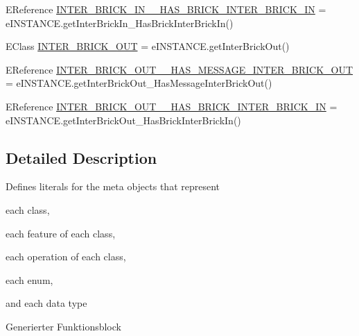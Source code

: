 \begin{DoxyCompactItemize}
\item 
E\-Reference \hyperlink{interfaceshootingmachineemfmodel_1_1_shootingmachineemfmodel_package_1_1_literals_a7ab2471dc236915d8eb7f817ffb4cfde}{I\-N\-T\-E\-R\-\_\-\-B\-R\-I\-C\-K\-\_\-\-I\-N\-\_\-\-\_\-\-H\-A\-S\-\_\-\-B\-R\-I\-C\-K\-\_\-\-I\-N\-T\-E\-R\-\_\-\-B\-R\-I\-C\-K\-\_\-\-I\-N} = e\-I\-N\-S\-T\-A\-N\-C\-E.\-get\-Inter\-Brick\-In\-\_\-\-Has\-Brick\-Inter\-Brick\-In()
\item 
E\-Class \hyperlink{interfaceshootingmachineemfmodel_1_1_shootingmachineemfmodel_package_1_1_literals_a6e54dbc9616d23f7886fc22da418e631}{I\-N\-T\-E\-R\-\_\-\-B\-R\-I\-C\-K\-\_\-\-O\-U\-T} = e\-I\-N\-S\-T\-A\-N\-C\-E.\-get\-Inter\-Brick\-Out()
\item 
E\-Reference \hyperlink{interfaceshootingmachineemfmodel_1_1_shootingmachineemfmodel_package_1_1_literals_a32d3cbcc4610d49a679037f792bd950c}{I\-N\-T\-E\-R\-\_\-\-B\-R\-I\-C\-K\-\_\-\-O\-U\-T\-\_\-\-\_\-\-H\-A\-S\-\_\-\-M\-E\-S\-S\-A\-G\-E\-\_\-\-I\-N\-T\-E\-R\-\_\-\-B\-R\-I\-C\-K\-\_\-\-O\-U\-T} = e\-I\-N\-S\-T\-A\-N\-C\-E.\-get\-Inter\-Brick\-Out\-\_\-\-Has\-Message\-Inter\-Brick\-Out()
\item 
E\-Reference \hyperlink{interfaceshootingmachineemfmodel_1_1_shootingmachineemfmodel_package_1_1_literals_a1d7df3786e32cbcd1e6b6c767feda7f1}{I\-N\-T\-E\-R\-\_\-\-B\-R\-I\-C\-K\-\_\-\-O\-U\-T\-\_\-\-\_\-\-H\-A\-S\-\_\-\-B\-R\-I\-C\-K\-\_\-\-I\-N\-T\-E\-R\-\_\-\-B\-R\-I\-C\-K\-\_\-\-I\-N} = e\-I\-N\-S\-T\-A\-N\-C\-E.\-get\-Inter\-Brick\-Out\-\_\-\-Has\-Brick\-Inter\-Brick\-In()
\end{DoxyCompactItemize}


\subsection{Detailed Description}
Defines literals for the meta objects that represent 
\begin{DoxyItemize}
\item each class, 
\item each feature of each class, 
\item each operation of each class, 
\item each enum, 
\item and each data type 
\end{DoxyItemize}

Generierter Funktionsblock 

